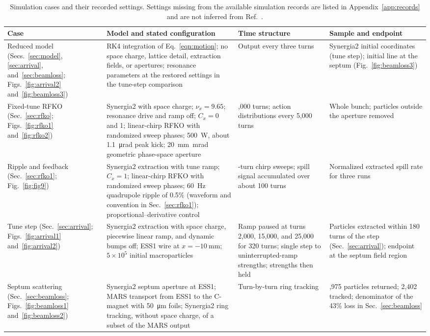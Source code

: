 \documentclass[a4paper,fleqn]{cas-sc}
\begin{document}
\begin{table}[width=\linewidth,cols=4,pos=tbp]
  \caption{\label{table:cases}Simulation cases and their recorded settings. Settings missing from the available simulation records are listed in Appendix~\ref{app:records} and are not inferred from Ref.~\cite{mu2e}.}
  \small
  \renewcommand{\arraystretch}{1.2}
  \begin{tabular}{@{}>{\raggedright\arraybackslash}p{.16\linewidth}>{\raggedright\arraybackslash}p{.31\linewidth}>{\raggedright\arraybackslash}p{.22\linewidth}>{\raggedright\arraybackslash}p{.22\linewidth}@{}}
    \toprule
    Case & Model and stated configuration & Time structure & Sample and endpoint \\
    \midrule
    Reduced model (Secs.~\ref{sec:model}, \ref{sec:arrival}, and~\ref{sec:beamloss}; Figs.~\ref{fig:arrival2} and~\ref{fig:beamloss3}) & RK4 integration of Eq.~\eqref{eqn:motion}; no space charge, lattice detail, extraction fields, or apertures; resonance parameters at the restored settings in the tune-step comparison & Output every three turns & Synergia2 initial coordinates (tune step); initial line at the septum (Fig.~\ref{fig:beamloss3}) \\
    Fixed-tune RFKO (Sec.~\ref{sec:rfko}; Figs.~\ref{fig:rfko1} and~\ref{fig:rfko2}) & Synergia2 with space charge; $\nu_x=9.65$; resonance drive and ramp off; $C_x=0$ and 1; linear-chirp RFKO with randomized sweep phases; \SI{500}{\watt}, about \SI{1.1}{\micro\radian} peak kick; \SI{20}{\milli\metre\milli\radian} geometric phase-space aperture & 30,000 turns; action distributions every 5,000 turns & Whole bunch; particles outside the aperture removed \\
    Ripple and feedback (Sec.~\ref{sec:rfko1}; Fig.~\ref{fig:fig9}) & Synergia2 extraction with tune ramp; $C_x=1$; linear-chirp RFKO with randomized sweep phases; \SI{60}{\hertz} quadrupole ripple of 0.5\% (waveform and convention in Sec.~\ref{sec:rfko1}); proportional--derivative control & 100-turn chirp sweeps; spill signal accumulated over about 100 turns & Normalized extracted spill rate for three runs \\
    Tune step (Sec.~\ref{sec:arrival}; Figs.~\ref{fig:arrival1} and~\ref{fig:arrival2}) & Synergia2 extraction with space charge, piecewise linear ramp, and dynamic bumps off; ESS1 wire at $x=\SI{-10}{\milli\metre}$; $5\times10^{5}$ initial macroparticles & Ramp paused at turns 2,000, 15,000, and 25,000 for 320 turns; single step to uninterrupted-ramp strengths; strengths then held & Particles extracted within 180 turns of the step (Sec.~\ref{sec:arrival}); endpoint at the septum field region \\
    Septum scattering (Sec.~\ref{sec:beamloss}; Figs.~\ref{fig:beamloss1} and~\ref{fig:beamloss2}) & Synergia2 septum aperture at ESS1; MARS transport from ESS1 to the C-magnet with \SI{50}{\micro\metre} foils; Synergia2 ring tracking, without space charge, of a subset of the MARS output & Turn-by-turn ring tracking & 127,975 particles returned; 2,402 tracked; denominator of the 43\% loss in Sec.~\ref{sec:beamloss} \\
    \bottomrule
  \end{tabular}
\end{table}
\end{document}
